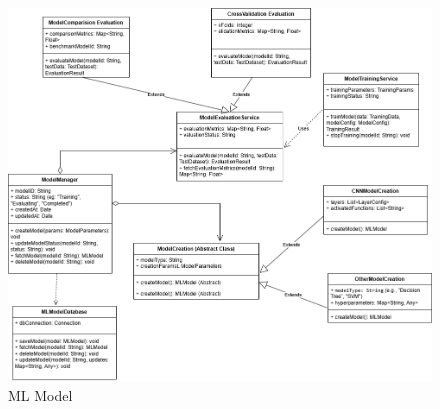 \documentclass[12pt, titlepage]{article}
\begin{document}
  \begin{figure}[H]
    \centering
    \includegraphics[width=1\textwidth]{Analysis_Class_Diagram_Model.png}
    \caption{ML Model}
    \label{FigUH}
  \end{figure}

\end{document}
